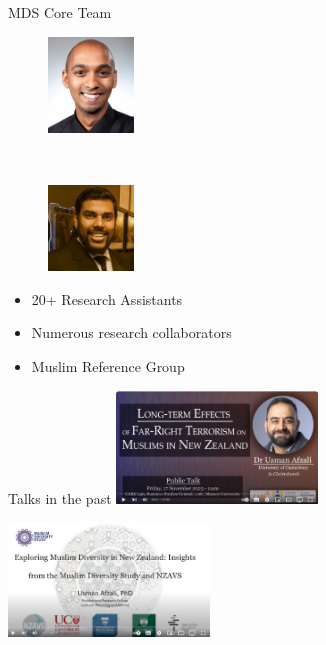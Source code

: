\documentclass[
  ignorenonframetext,
  aspectratio=169,
]{beamer}
\providecommand{\tightlist}{%
  \setlength{\itemsep}{0pt}\setlength{\parskip}{0pt}}\usepackage{longtable,booktabs,array}
\begin{document}
\begin{frame}{MDS Core Team}
\begin{figure}
\begin{minipage}{0.40\linewidth}
\includegraphics[width=0.9in,height=\textheight]{figs/kumar-y.jpg}\end{minipage}%
%
\begin{minipage}{0.20\linewidth}
~\end{minipage}%
%
\begin{minipage}{0.40\linewidth}
\includegraphics[width=0.9in,height=\textheight]{figs/aarif-r.jpeg}\end{minipage}%

\end{figure}%
\end{frame}

\begin{frame}
\begin{itemize}
\tightlist
\item
  20+ Research Assistants
\item
  Numerous research collaborators
\item
  Muslim Reference Group
\end{itemize}
\end{frame}

\begin{frame}{Talks in the past}
\label{talks-in-the-past}
\includegraphics[width=0.4\textwidth,height=\textheight]{figs/care-lecture.png}

\includegraphics[width=0.4\textwidth,height=\textheight]{figs/uc-lecture.png}
\end{frame}
\end{document}
